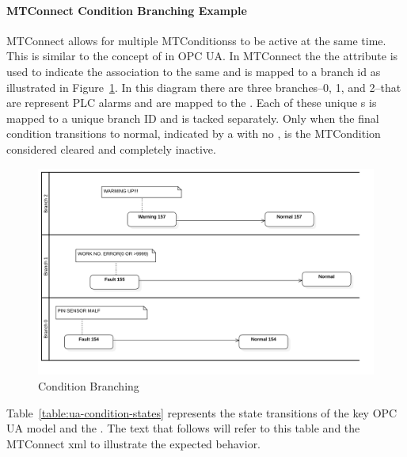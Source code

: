 \paragraph{MTConnect Condition Branching Example}

MTConnect allows for multiple \glspl{MTCondition}s to be active at the same time. This is similar to the concept of  in OPC UA. In MTConnect the the attribute  is used to indicate the association to the same  and is mapped to a branch id as illustrated in Figure~\ref{fig:condition-branching}. In this diagram there are three branches--0, 1, and 2--that are represent PLC alarms and are mapped to the . Each of these unique s is mapped to a unique branch ID and is tacked separately. Only when the final condition transitions to normal, indicated by a  with no , is the \gls{MTCondition} considered cleared and completely inactive.

\begin{figure}[ht]
  \centering
  \includegraphics[width=1.0\textwidth]{diagrams/mtconnect-mapping/condition-branching.png}
  \caption{Condition Branching}
  \label{fig:condition-branching}
\end{figure}

Table~\ref{table:ua-condition-states} represents the state transitions of the key OPC UA  model and the . The text that follows will refer to this table and the MTConnect \gls{xml} to illustrate the expected behavior.


